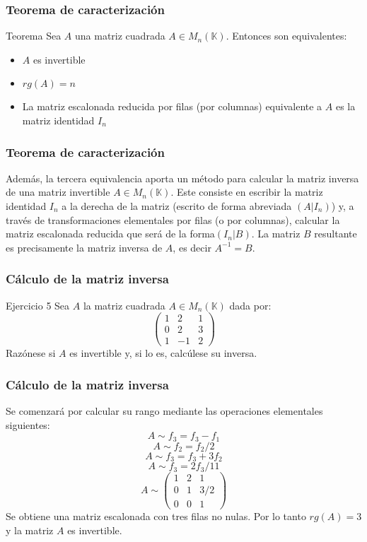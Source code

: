 \documentclass[12pt]{article}
\begin{document}
    
     \begin{frame}
  \frametitle{Teorema de caracterizaci\'on}
   \begin{block}{Teorema}
Sea $A$ una matriz cuadrada $A\in M_n(\mathbb{K})$. Entonces son equivalentes:
\begin{itemize}
\item $A$ es invertible
\item $rg(A) = n$
\item La matriz escalonada reducida por filas (por columnas) equivalente a $A$ es la matriz identidad $I_n$
\end{itemize}
\end{block}
  \end{frame} 
  
       \begin{frame}
  \frametitle{Teorema de caracterizaci\'on}
Adem\'as, la tercera equivalencia aporta un m\'etodo para calcular la matriz inversa de una matriz invertible $A \in M_n(\mathbb{K})$. Este consiste en escribir la matriz identidad $I_n$ a la derecha de la matriz (escrito de forma abreviada $(A | I_n)$) y, a trav\'es de transformaciones elementales por filas (o por columnas), calcular la matriz escalonada reducida que ser\'a de la forma$(I_n | B)$. La matriz $B$ resultante es precisamente la matriz inversa de $A$, es decir $A^{-1} = B$.
    \end{frame} 


     \begin{frame}
  \frametitle{C\'alculo de la matriz inversa}
   \begin{block}{Ejercicio 5}
Sea $A$ la matriz cuadrada $A\in M_n(\mathbb{K})$ dada por:
\[ \left(\begin{array}{ccc}1 & 2 & 1 \\0 & 2 & 3 \\1 & -1 & 2\end{array}\right)\]
Raz\'onese si $A$ es invertible y, si lo es, calc\'ulese su inversa.
\end{block}
  \end{frame} 
  
    \begin{frame}
  \frametitle{C\'alculo de la matriz inversa}
Se comenzar\'a por calcular su rango mediante las operaciones elementales siguientes:
\[A\sim f_3 = f_3-f_1\]
\[A\sim f_2 = f_2/2\]
\[A\sim f_3 = f_3+3f_2\]
\[A\sim f_3 = 2f_3/11\]
\[A\sim \left(\begin{array}{ccc}1 & 2 & 1 \\0 & 1 & 3/2 \\0 & 0 & 1\end{array}\right)\]
Se obtiene una matriz escalonada con tres filas no nulas. Por lo tanto $rg(A)=3$ y la matriz $A$ es invertible.
  \end{frame} 
\end{document}
